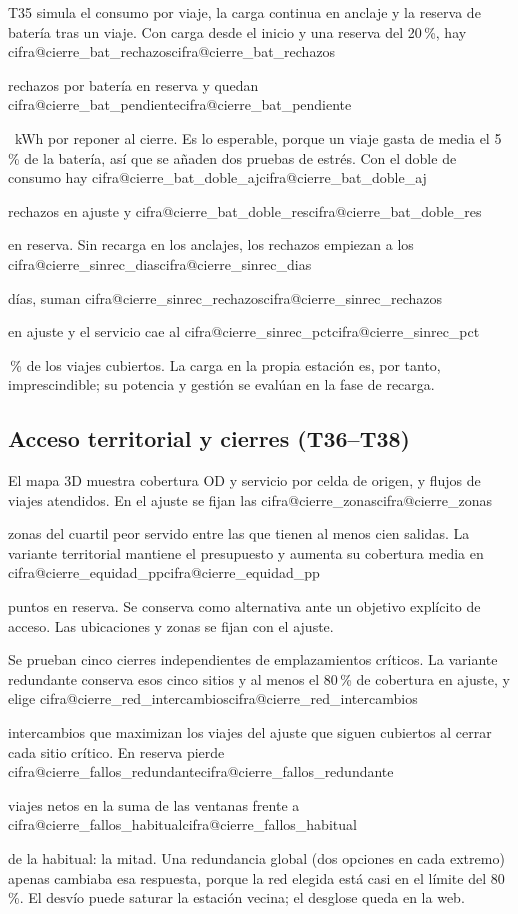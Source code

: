 \documentclass[11pt,a4paper]{article}
\makeatletter
\newcommand\cifra[1]{\ifcsname cifra@#1\endcsname\csname cifra@#1\endcsname
  \else\PackageError{memoria}{Cifra desconocida: \detokenize{#1}}{Revisa generar_cifras.py}\fi}
\newcommand\pc{\,\%}
\makeatother
\begin{document}
T35 simula el consumo por viaje, la carga continua en anclaje y la reserva
de batería tras un viaje. Con carga desde el inicio y una reserva del
20\pc{}, hay \cifra{cierre_bat_rechazos} rechazos por batería en reserva y
quedan \cifra{cierre_bat_pendiente}~kWh por reponer al cierre. Es lo esperable,
porque un viaje gasta de media el 5\pc{} de la batería, así que se añaden dos
pruebas de estrés. Con el doble de consumo hay \cifra{cierre_bat_doble_aj}
rechazos en ajuste y \cifra{cierre_bat_doble_res} en reserva. Sin recarga en
los anclajes, los rechazos empiezan a los \cifra{cierre_sinrec_dias} días, suman
\cifra{cierre_sinrec_rechazos} en ajuste y el servicio cae al
\cifra{cierre_sinrec_pct}\pc{} de los viajes cubiertos. La carga en la propia
estación es, por tanto, imprescindible; su potencia y gestión se evalúan en la
fase de recarga.

\subsection{Acceso territorial y cierres (T36--T38)}
El mapa 3D muestra cobertura OD y servicio por celda de origen, y flujos
de viajes atendidos. En el ajuste se fijan las \cifra{cierre_zonas} zonas del
cuartil peor servido entre las que tienen al menos cien salidas. La variante
territorial mantiene el presupuesto y aumenta su cobertura media en
\cifra{cierre_equidad_pp} puntos en reserva. Se conserva como alternativa
ante un objetivo explícito de acceso. Las ubicaciones y zonas se fijan con
el ajuste.

Se prueban cinco cierres independientes de emplazamientos críticos. La
variante redundante conserva esos cinco sitios y al menos el 80\pc{} de
cobertura en ajuste, y elige \cifra{cierre_red_intercambios} intercambios que
maximizan los viajes del ajuste que siguen cubiertos al cerrar cada sitio
crítico. En reserva pierde \cifra{cierre_fallos_redundante} viajes netos en la
suma de las ventanas frente a \cifra{cierre_fallos_habitual} de la habitual: la
mitad. Una redundancia global (dos opciones en cada extremo) apenas cambiaba esa
respuesta, porque la red elegida está casi en el límite del 80\pc{}. El
desvío puede saturar la estación vecina; el desglose queda en la web.
\end{document}
